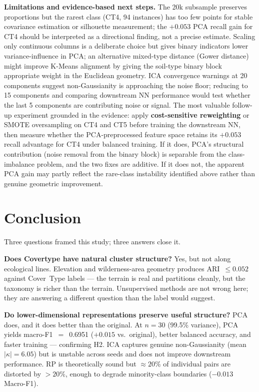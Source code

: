 \documentclass[conference]{IEEEtran}
\begin{document}
\textbf{Limitations and evidence-based next steps.}
The 20k subsample preserves proportions but the rarest class (CT4, 94 instances)
has too few points for stable covariance estimation or silhouette measurement;
the $+0.053$ PCA recall gain for CT4 should be interpreted as a directional
finding, not a precise estimate.
Scaling only continuous columns is a deliberate choice but gives binary
indicators lower variance-influence in PCA; an alternative mixed-type
distance (Gower distance) might improve K-Means alignment by giving the
soil-type binary block appropriate weight in the Euclidean geometry.
ICA convergence warnings at 20 components suggest non-Gaussianity is
approaching the noise floor; reducing to 15 components and comparing
downstream NN performance would test whether the last 5 components
are contributing noise or signal.
The most valuable follow-up experiment grounded in the evidence: apply
\textbf{cost-sensitive reweighting} or SMOTE oversampling on CT4 and CT5
before training the downstream NN, then measure whether the PCA-preprocessed
feature space retains its $+0.053$ recall advantage for CT4 under
balanced training.
If it does, PCA's structural contribution (noise removal from the binary block)
is separable from the class-imbalance problem, and the two fixes are additive.
If it does not, the apparent PCA gain may partly reflect the rare-class
instability identified above rather than genuine geometric improvement.

\section{Conclusion}\label{sec:conclusion}

Three questions framed this study; three answers close it.

\textbf{Does Covertype have natural cluster structure?}
Yes, but not along ecological lines.
Elevation and wilderness-area geometry produces ARI~$\leq 0.052$ against
Cover~Type labels --- the terrain is real and partitions cleanly,
but the taxonomy is richer than the terrain.
Unsupervised methods are not wrong here; they are answering a different
question than the label would suggest.

\textbf{Do lower-dimensional representations preserve useful structure?}
PCA does, and it does better than the original.
At $n{=}30$ (99.5\% variance), PCA yields macro-F1~$=$~0.6951
($+0.015$ vs.\ original), better balanced accuracy, and faster training ---
confirming H2.
ICA captures genuine non-Gaussianity (mean $|\kappa|{=}6.05$) but is
unstable across seeds and does not improve downstream performance.
RP is theoretically sound but ${\approx}20\%$ of individual pairs are
distorted by $>{20\%}$, enough to degrade minority-class boundaries
($-0.013$ Macro-F1).
\end{document}

